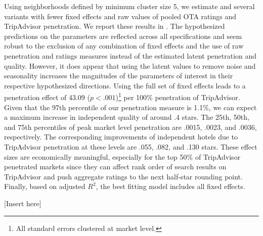 \documentclass[mksc,blindrev]{informs3} %
\begin{document}
Using neighborhoods defined by minimum cluster size 5, we estimate  and several variants with fewer fixed effects and raw values of pooled OTA ratings and TripAdvisor penetration. We report these results in . The hypothesized predictions on the parameters are reflected across all specifications and seem robust to the exclusion of any combination of fixed effects and the use of raw penetration and ratings measures instead of the estimated latent penetration and quality. However, it does appear that using the latent values to remove noise and seasonality increases the magnitudes of the parameters of interest in their respective hypothesized directions. Using the full set of fixed effects leads to a penetration effect of 43.09 ($p<.001$)\footnote{All standard errors clustered at market level.} per 100\% penetration of TripAdvisor. Given that the 97th percentile of our penetration measure is 1.1\%, we can expect a maximum increase in independent quality of around .4 stars. The 25th, 50th, and 75th percentiles of peak market level penetration are .0015, .0023, and .0036, respectively. The corresponding improvements of independent hotels due to TripAdvisor penetration at these levels are .055, .082, and .130 stars. These effect sizes are economically meaningful, especially for the top 50\% of TripAdvisor penetrated markets since they can affect rank order of search results on TripAdvisor and push aggregate ratings to the next half-star rounding point. Finally, based on adjusted $R^2$, the best fitting model includes all fixed effects.

[Insert  here]

\end{document}
